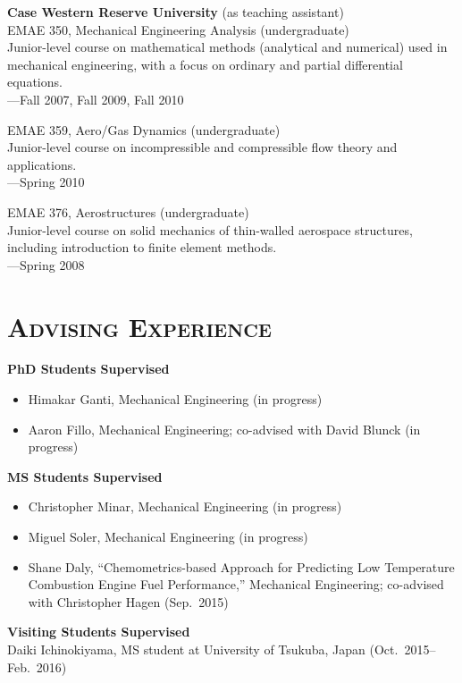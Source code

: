 \documentclass[margin,line,11pt]{res}
\begin{document}
\begin{resume}
\textbf{Case Western Reserve University} (as teaching assistant) \\
EMAE 350, Mechanical Engineering Analysis (undergraduate) \\
Junior-level course on mathematical methods (analytical and numerical) used in mechanical engineering, with a focus on ordinary and partial differential equations. \\
---Fall 2007, Fall 2009, Fall 2010

EMAE 359, Aero\slash Gas Dynamics (undergraduate) \\
Junior-level course on incompressible and compressible flow theory and applications. \\
---Spring 2010

EMAE 376, Aerostructures (undergraduate) \\
Junior-level course on solid mechanics of thin-walled aerospace structures, including introduction to finite element methods. \\
---Spring 2008

\section{\textsc{Advising Experience}}

\textbf{PhD Students Supervised}
\begin{itemize}[leftmargin=*]
\item Himakar Ganti, Mechanical Engineering (in progress)
\item Aaron Fillo, Mechanical Engineering; co-advised with David Blunck (in progress)
\end{itemize}

\textbf{MS Students Supervised}
\begin{itemize}[leftmargin=*]
\item Christopher Minar, Mechanical Engineering (in progress)
\item Miguel Soler, Mechanical Engineering (in progress)
\item Shane Daly, ``Chemometrics-based Approach for Predicting Low Temperature Combustion Engine Fuel Performance,'' Mechanical Engineering; co-advised with Christopher Hagen (Sep.\ 2015)
\end{itemize}

\textbf{Visiting Students Supervised} \\
Daiki Ichinokiyama, MS student at University of Tsukuba, Japan (Oct.\ 2015--Feb.\ 2016)


\end{resume}
\end{document}
